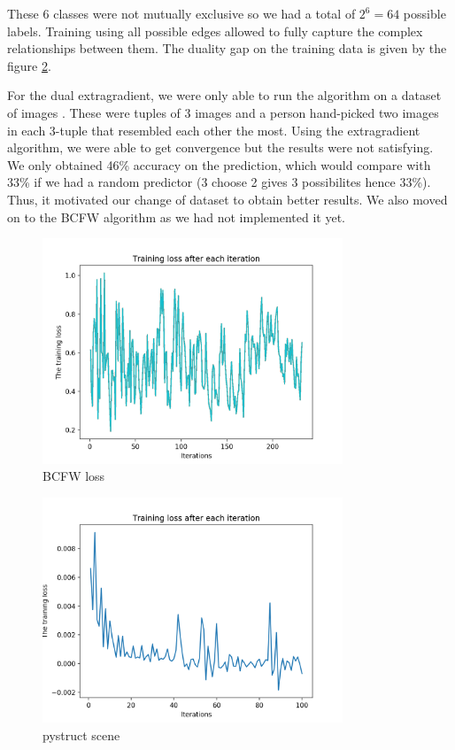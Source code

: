 These 6 classes were not mutually exclusive so we had a total of $2^6=64$
possible labels. Training using all possible edges allowed to fully capture the
complex relationships between them. The duality gap on the training data is
given by the figure \ref{fig:bcfwLoss}.

For the dual extragradient, we were only able to run the algorithm on a dataset
of images \citet{vemulapalliCompactEmbeddingFacial2018}. These were tuples of 3 images and a person
hand-picked two images in each 3-tuple that resembled each other the most. Using the
extragradient algorithm, we were able to get convergence but the results were not 
satisfying. We only obtained 46\% accuracy on the prediction, which would compare 
with 33\% if we had a random predictor (3 choose 2 gives 3  possibilites hence 33\%).
Thus, it motivated our change of dataset to obtain better results. We also moved on to
the BCFW algorithm as we had not implemented it yet.

\begin{figure}[htbp!]
  \center
  \includegraphics[width=0.8\textwidth]{loss_bcfw.png}
  \caption{BCFW loss}
  \label{fig:bcfwLoss}
\end{figure} 
\begin{figure}[htbp!]
  \center
  \includegraphics[width=0.8\textwidth]{pystruct_scene.png}
  \caption{pystruct scene}
  \label{fig:bcfwLoss}
\end{figure} 


